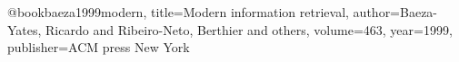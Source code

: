 @book{baeza1999modern,
  title={Modern information retrieval},
  author={Baeza-Yates, Ricardo and Ribeiro-Neto, Berthier and others},
  volume={463},
  year={1999},
  publisher={ACM press New York}
}